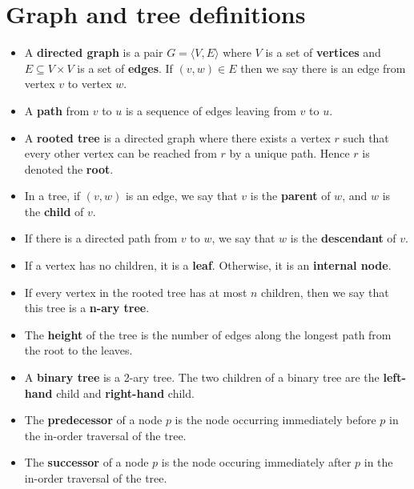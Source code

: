 \documentclass[a4paper]{article}
\begin{document}
\section{Graph and tree definitions}
\begin{itemize}
	\item A \textbf{directed graph} is a pair $G=\langle V,E\rangle$ where $V$ is a set of \textbf{vertices} and $E \subseteq V \times V$ is a set of \textbf{edges}. If $(v, w) \in E$ then we say there is an edge from vertex $v$ to vertex $w$.
	\item A \textbf{path} from $v$ to $u$ is a sequence of edges leaving from $v$ to $u$.
	\item A \textbf{rooted tree} is a directed graph where there exists a vertex $r$ such that every other vertex can be reached from $r$ by a unique path. Hence $r$ is denoted the \textbf{root}.
	\item In a tree, if $(v, w)$ is an edge, we say that $v$ is the \textbf{parent} of $w$, and $w$ is the \textbf{child} of $v$.
	\item If there is a directed path from $v$ to $w$, we say that $w$ is the \textbf{descendant} of $v$.
	\item If a vertex has no children, it is a \textbf{leaf}. Otherwise, it is an \textbf{internal node}.
	\item If every vertex in the rooted tree has at most $n$ children, then we say that this tree is a \textbf{n-ary tree}.
	\item The \textbf{height} of the tree is the number of edges along the longest path from the root to the leaves.
	\item A \textbf{binary tree} is a 2-ary tree. The two children of a binary tree are the \textbf{left-hand} child and \textbf{right-hand} child.
	\item The \textbf{predecessor} of a node $p$ is the node occurring immediately before $p$ in the in-order traversal of the tree.
	\item The \textbf{successor} of a node $p$ is the node occuring immediately after $p$ in the in-order traversal of the tree.
\end{itemize}
\end{document}
